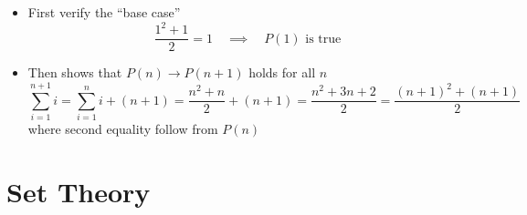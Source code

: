 \documentclass[11pt,twoside]{report}
\begin{document}
\begin{itemize}
\begin{itemize}
\item First verify the ``base case''
\[
 \frac{ 1^2 + 1}{2} = 1   \quad \implies \quad P(1) \text{ is true} 
\]
\item Then shows that $P(n) \to P(n+1)$ holds for all $n$
\[
\sum_{i=1}^{n+1} i = \sum_{i=1}^{n} i  + (n+1) = \frac{n^2 + n}{2}  + (n+1)  = \frac{ n^2 + 3n + 2}{ 2}  = \frac{ (n+1)^2  + (n+1)}{2} 
\]
where second equality follow from $P(n)$
\end{itemize} 

\end{itemize}


  
\section{Set Theory} 
\end{document}
